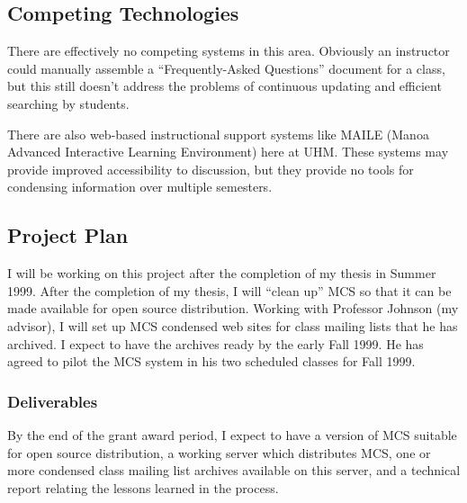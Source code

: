 \subsection{Competing Technologies}
There are effectively no competing systems in this area. Obviously an
instructor could manually assemble a ``Frequently-Asked Questions'' document
for a class, but this still doesn't address the problems of continuous updating 
and efficient searching by students.

There are also web-based instructional support systems like MAILE (Manoa Advanced
Interactive Learning Environment) here at UHM. These systems may provide
improved accessibility to discussion, but they provide no tools for condensing
information over multiple semesters.





\subsection{Project Plan}

I will be working on this project after the completion of my thesis in Summer
1999. After the completion of my thesis, I will ``clean up'' MCS so that it can
be made available for open source distribution. Working with Professor Johnson
(my advisor), I will set up MCS condensed web sites for class mailing lists
that he has archived. I expect to have the archives ready by the early Fall
1999. He has agreed to pilot the MCS system in his two scheduled classes for
Fall 1999.

\subsubsection{Deliverables}
By the end of the grant award period, I expect to have a version of MCS
suitable for open source distribution, a working server which distributes MCS,
one or more condensed class mailing list archives available on this server, and
a technical report relating the lessons learned in the process.
